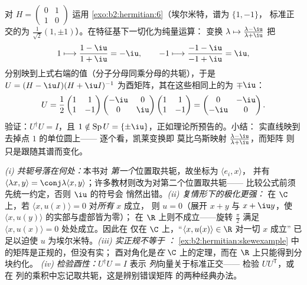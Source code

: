 \begin{example}[凯莱变换的计算]\label{ex:b2:hermitian:cayleyrun}
对 $H = \begin{pmatrix} 0 & 1\\
1 & 0\end{pmatrix}$ 运用 \cref{exo:b2:hermitian:6}（埃尔米特，谱为 $\{1, -1\}$，
标准正交的为 $\frac{1}{\sqrt2}(1, \pm1)$）。在特征基下一切化为纯量运算：
变换 $\lambda
\mapsto \frac{\lambda - \iu}{\lambda + \iu}$ 把
\[
1 \longmapsto \frac{1 - \iu}{1 + \iu} = -\iu,
\qquad
-1 \longmapsto \frac{-1 - \iu}{-1 + \iu} = \iu ,
\]
分别映到上式右端的值（分子分母同乘分母的共轭），于是 $U = (H -
\iu I)(H + \iu I)^{-1}$ 为酉矩阵，其在这些相同上的为
$\mp\iu$：
\[
U = \frac{1}{2}\begin{pmatrix} 1 & 1\\ 1 & -1\end{pmatrix}
\begin{pmatrix} -\iu & 0\\ 0 & \iu\end{pmatrix}
\begin{pmatrix} 1 & 1\\ 1 & -1\end{pmatrix}
= \begin{pmatrix} 0 & -\iu\\ -\iu & 0\end{pmatrix} .
\]
验证：$U^\dagger U = I$，且 $1 \notin \operatorname{Sp}U =
\{\pm\iu\}$，正如理论所预告的。小结：
实直线映到去掉点 $1$ 的单位圆上——
逐个看，凯莱变换即
莫比乌斯映射 $\frac{\lambda-\iu}{\lambda+\iu}$，而矩阵
则只是跟随其谱而变化。
\end{example}

\begin{remark}[常见误区]
\emph{(i) 共轭号落在何处：}本书对
\emph{第一个}位置取共轭，故坐标为 $\langle e_i, x\rangle$，
并有 $\langle\lambda x, y\rangle = \conj\lambda\langle x,
y\rangle$；许多教材则改为对第二个位置取共轭——
比较公式前须先统一约定，否则 $\iu$ 的符号会
悄然出错。\emph{(ii) 复情形下的极化更强：}
在 $\C$ 上，若 $\langle x, u(x)\rangle = 0$ 对\emph{所有} $x$ 成立，
则 $u = 0$（展开 $x + y$ 与 $x + \iu y$，使
$\langle x, u(y)\rangle$ 的实部与虚部皆为零）；
在 $\R$ 上则不成立——旋转 $\frac\pi2$ 满足
$\langle x, u(x)\rangle = 0$ 处处成立。因此在
仅在 $\C$ 上，“$\langle x, u(x)\rangle \in \R$ 对一切 $x$ 成立”
已足以迫使 $u$ 为埃尔米特。\emph{(iii) 实正规不等于
：}
\cref{ex:b2:hermitian:skewexample} 中的矩阵是正规的，但没有实；
酉对角化是\emph{在}
$\C$ 上的定理，而在 $\R$ 上只能得到分块约化。
\emph{(iv) 检验酉性：}$U^\dagger U = I$ 表示
\emph{列}向量关于标准正交——
检验 $UU^{\mathsf T}$，或在
列的乘积中忘记取共轭，这是辨别错误矩阵
的两种经典办法。
\end{remark}

